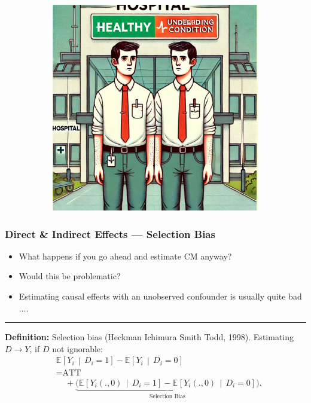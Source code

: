 \documentclass[dvipsnames,handout]{beamer} %
\newcommand{\Egiven}[3][]{\mathbb{E}_{#1} \left[ #2 \, \middle\vert \, #3 \right]} %
\begin{document}
\begin{frame}[noframenumbering]
\begin{figure}[h!]
\begin{subfigure}[c]{0.475\textwidth}
            \includegraphics[width=\textwidth]{
                presentation-files/headlines/health-differences.jpg}
        \end{subfigure}
    \end{figure}
\end{frame}
\begin{frame}
    \frametitle{Direct \& Indirect Effects --- Selection Bias}
    \begin{itemize}
        \item What happens if you go ahead and estimate CM anyway?
        \item Would this be problematic?
        \item Estimating causal effects with an unobserved confounder is usually quite bad$\hdots$.
    \end{itemize}
    \par\noindent\rule{\textwidth}{0.4pt}
    \vskip0.25cm
    \textbf{Definition:} Selection bias (Heckman Ichimura Smith Todd, 1998).
    \vskip0.25cm
    Estimating $D \to Y$, if $D$ not ignorable:
    \begin{align*}
        &\Egiven{ Y_i}{D_i =1} - \Egiven{ Y_i}{D_i =0} \\
        &= \text{ATT} \\
        &\;\;\;\; + \underbrace{\Big(
            \Egiven{ Y_i(.,0)}{D_i =1} - \Egiven{ Y_i(.,0)}{D_i =0} \Big)}_{
                \text{Selection Bias}}.
    \end{align*}
    \vskip1.125cm
\end{frame}
\end{document}
